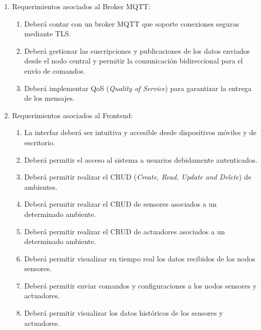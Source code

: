 \documentclass[
11pt, %
codirector, %
]{charter}
\begin{document}
\begin{enumerate}

	\item Requerimientos asociados al Broker MQTT:
	      \begin{enumerate}
		      \item Deberá contar con un broker MQTT que soporte conexiones seguras mediante TLS.
		      \item Deberá gestionar las suscripciones y publicaciones de los datos enviados desde
		            el nodo central y permitir la comunicación bidireccional para el envío de
		            comandos.
		      \item Deberá implementar QoS (\textit{Quality of Service}) para garantizar la entrega
		            de los mensajes.
	      \end{enumerate}

	\item Requerimientos asociados al Frontend:
	      \begin{enumerate}
		      \item La interfaz deberá ser intuitiva y accesible desde dispositivos móviles y de
		            escritorio.
		      \item Deberá permitir el acceso al sistema a usuarios debidamente autenticados.
		      \item Deberá permitir realizar el CRUD (\textit{Create, Read, Update and Delete}) de
		            ambientes.
		      \item Deberá permitir realizar el CRUD de sensores asociados a un determinado
		            ambiente.
		      \item Deberá permitir realizar el CRUD de actuadores asociados a un determinado
		            ambiente.
		      \item Deberá permitir visualizar en tiempo real los datos recibidos de los nodos
		            sensores.
		      \item Deberá permitir enviar comandos y configuraciones a los nodos sensores y
		            actuadores.
		      \item Deberá permitir visualizar los datos históricos de los sensores y actuadores.
	      \end{enumerate}


\end{enumerate}
\end{document}

